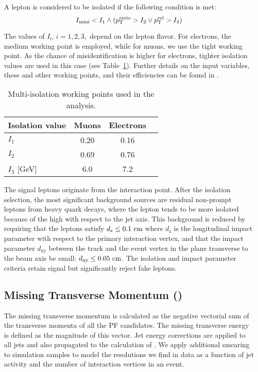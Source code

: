 A lepton is considered to be isolated if the following condition is met:
\begin{equation}
	I_\text{mini} < I_1 \wedge ( p_{\mathrm{T}}^\text{ratio} > I_2 \vee p_{\mathrm{T}}^\text{rel} > I_3 )
\end{equation}

The values of $I_\text{i}$, $i = 1,2,3,$ depend on the lepton flavor. For electrons, the medium working point is employed, while for muons, we use the tight working point. As the chance of misidentification is higher for electrons, tighter isolation values are used in this case (see Table~\ref{tab:isoWPs}). Further details on the input variables, these and other working points, and their efficiencies can be found in \cite{CMS-PAS-SUS-15-008}.

\begin{table}
\centering
\caption{Multi-isolation working points used in the analysis.} \label{tab:isoWPs}
\begin{tabular}{l ccc}
\hline\hline
Isolation value & Muons & Electrons  \\
\hline
$I_1$ & 0.20 & 0.16 \\
$I_2$ & 0.69 & 0.76 \\
$I_3$ [GeV] & 6.0 & 7.2 \\
\hline
\end{tabular}
\end{table}

The signal leptons originate from the interaction point. After the isolation selection, the most significant background sources are residual non-prompt leptons from heavy quark decays, where the lepton tends to be more isolated because of the high \pt with respect to the jet axis. This background is reduced by requiring that the leptons satisfy $d_\textrm{z} \leq 0.1\,\,\text{cm}$ where $d_\textrm{z}$ is the longitudinal impact parameter with respect to the primary interaction vertex, and that the impact parameter $d_\textrm{xy}$ between the track and the event vertex in the plane transverse to the beam axis be small: $d_\textrm{xy} \leq 0.05\,\,\text{cm}$. The isolation and impact parameter criteria retain signal but significantly reject fake leptons.

\subsection{Missing Transverse Momentum (\MET)}
The missing transverse momentum is calculated as the negative vectorial sum of the transverse momenta of all the PF candidates. The missing transverse energy \MET is defined as the magnitude of this vector. Jet energy corrections are applied to all jets and also propagated to the calculation of \MET \cite{CMS-PAS-JME-12-002}. We apply additional smearing to simulation samples to model the \MET resolutions we find in data as a function of jet activity and the number of interaction vertices in an event.


